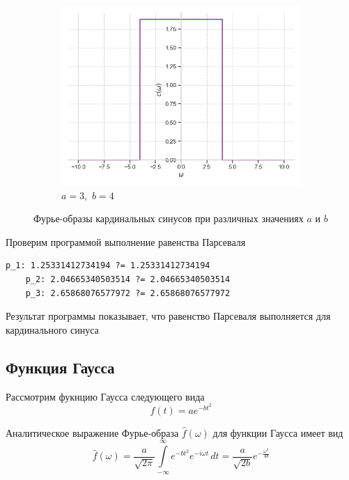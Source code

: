 \documentclass[a4paper, 16pt]{article}
\begin{document}
\begin{figure}[htbp]
\begin{subfigure}{0.3\textwidth}
            \centering
            \includegraphics[width=\linewidth]{sincfimg_a=3_b=4.png}
            \caption{$a=3,\,\,b=4$}
            \label{fig:sincfimg_3}
        \end{subfigure}
        \caption{Фурье-образы кардинальных синусов при различных значениях $a$ и $b$}
        \label{fig:sincfimgs}
    \end{figure}


    \noindent Проверим программой выполнение равенства Парсеваля
    \begin{lstlisting}[label=pars_sinc, caption=Равенство Парсеваля для кардинальных синусов]
    p_1: 1.25331412734194 ?= 1.25331412734194
    p_2: 2.04665340503514 ?= 2.04665340503514
    p_3: 2.65868076577972 ?= 2.65868076577972
    \end{lstlisting}


    \noindent Результат программы показывает, что равенство Парсеваля выполняется для кардинального синуса


    \subsection{Функция Гаусса}
    \noindent Рассмотрим фукнцию Гаусса следующего вида
    $$
    f(t)=ae^{-bt^2}
    $$


    \noindent Аналитическое выражение Фурье-образа $\hat{f}(\omega)$ для функции Гаусса
    имеет вид
    $$
    \hat{f}(\omega)=\dfrac{a}{\sqrt{2\pi}}\int\limits_{-\infty}^{\infty}e^{-bt^2}e^{-i\omega t}\,dt=\dfrac{a}{\sqrt{2b}}e^{-\frac{\omega^2}{4b}}
    $$
\end{document}
